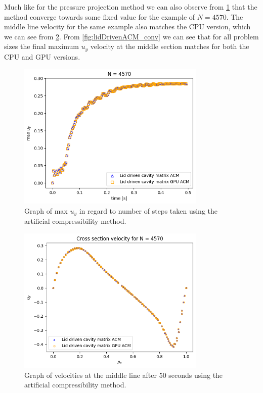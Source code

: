 \documentclass{article}
\begin{document}
Much like for the pressure projection method we can also observe from \ref{fig:lidDrivenACM_convergence} that 
the method converge towards some fixed value for the example of \(N = 4570\). The middle line velocity
for the same example also matches the CPU version, which we can
see from \ref{fig:lidDrivenACM_cross}. From \ref{fig:lidDrivenACM_conv} we can see that for all 
problem sizes the final maximum \(u_y\) velocity at the middle section matches for both the 
CPU and GPU versions.
\begin{figure}[h!] 
    \centering 
    \includegraphics[width=0.8\textwidth]{plots/lidDrivenACM_convergence.png} 
    \caption{Graph of max $u_y$ in regard to number of steps taken using the artificial compressibility method.} 
    \label{fig:lidDrivenACM_convergence} 
\end{figure}
\begin{figure}[h!] 
    \centering 
    \includegraphics[width=0.8\textwidth]{plots/lidDrivenACM_cross.png} 
    \caption{Graph of velocities at the middle line after 50 seconds using the artificial compressibility method.} 
    \label{fig:lidDrivenACM_cross} 
\end{figure}
\end{document}
